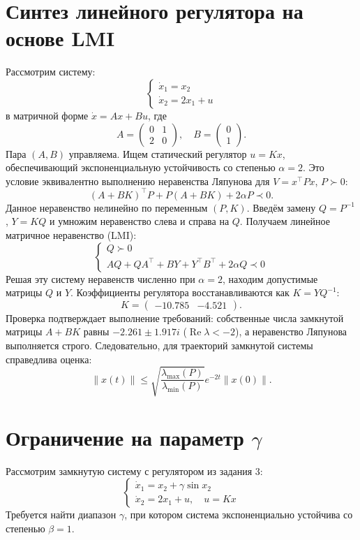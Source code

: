 \documentclass[12pt,a4paper]{article}
\begin{document}
	
	\newpage
\section{Синтез линейного регулятора на основе LMI}

Рассмотрим систему:
\[
\begin{cases} 
	\dot x_1=x_2 \\ 
	\dot x_2=2x_1+u 
\end{cases}
\]
в матричной форме $\dot x=Ax+Bu$, где
\[
A=\begin{pmatrix}0&1\\2&0\end{pmatrix}, \quad B=\begin{pmatrix}0\\1\end{pmatrix}.
\]
Пара $(A,B)$ управляема. Ищем статический регулятор $u=Kx$, обеспечивающий экспоненциальную устойчивость со степенью $\alpha=2$. Это условие эквивалентно выполнению неравенства Ляпунова для $V=x^\top Px$, $P\succ0$:
\[
(A+BK)^\top P + P(A+BK) + 2\alpha P \prec 0.
\]
Данное неравенство нелинейно по переменным $(P,K)$. Введём замену $Q=P^{-1}$, $Y=KQ$ и умножим неравенство слева и справа на $Q$. Получаем линейное матричное неравенство (LMI):
\[
\begin{cases} 
	Q \succ 0 \\ 
	AQ + QA^\top + BY + Y^\top B^\top + 2\alpha Q \prec 0 
\end{cases}
\]
Решая эту систему неравенств численно при $\alpha=2$, находим допустимые матрицы $Q$ и $Y$. Коэффициенты регулятора восстанавливаются как $K=YQ^{-1}$:
\[
K = \begin{pmatrix}-10.785 & -4.521\end{pmatrix}.
\]
Проверка подтверждает выполнение требований: собственные числа замкнутой матрицы $A+BK$ равны $-2.261 \pm 1.917i$ ($\operatorname{Re}\lambda < -2$), а неравенство Ляпунова выполняется строго. Следовательно, для траекторий замкнутой системы справедлива оценка:
\[
\|x(t)\| \le \sqrt{\frac{\lambda_{\max}(P)}{\lambda_{\min}(P)}} e^{-2t} \|x(0)\|.
\]

	
	\newpage
\section{Ограничение на параметр $\gamma$}

Рассмотрим замкнутую систему с регулятором из задания 3:
\[
\begin{cases} 
	\dot x_1 = x_2 + \gamma \sin x_2 \\ 
	\dot x_2 = 2x_1 + u, \quad u = Kx 
\end{cases}
\]
Требуется найти диапазон $\gamma$, при котором система экспоненциально устойчива со степенью $\beta=1$.
\end{document}
